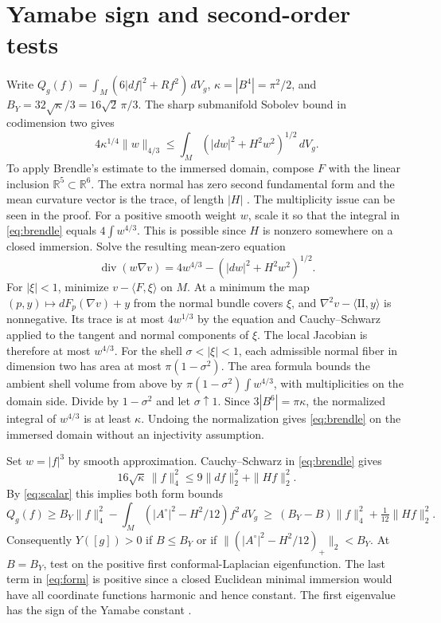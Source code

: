 \documentclass[11pt,letterpaper]{article}
\numberwithin{equation}{section}
\newcommand{\R}{\mathbb R}
\begin{document}
\section{Yamabe sign and second-order tests}\label{sec:sign}

Write \(Q_g(f)=\int_M(6|df|^2+Rf^2)\,dV_g\),
\(\kappa=|B^4|=\pi^2/2\), and \(B_Y=32\sqrt\kappa/3=16\sqrt2\,\pi/3\).
The sharp submanifold Sobolev bound in codimension two gives
\begin{equation}\label{eq:brendle}
 4\kappa^{1/4}\|w\|_{4/3}
 \le \int_M (|dw|^2+H^2w^2)^{1/2}\,dV_g .
\end{equation}
To apply Brendle's estimate to the immersed domain, compose
\(F\) with the linear inclusion \(\R^5\subset\R^6\). The extra
normal has zero second fundamental form and the mean curvature
vector is the trace, of length \(|H|\)
\cite[Corollary 2 and \S2, Lemmas 4--6]{Brendle2021Isoperimetric}.
The multiplicity issue can be seen in the proof. For a positive
smooth weight \(w\), scale it so that the integral in
\eqref{eq:brendle} equals \(4\int w^{4/3}\).
This is possible since \(H\) is nonzero somewhere on a closed
immersion. Solve the resulting mean-zero equation
\[
 \operatorname{div}(w\nabla v)=4w^{4/3}-(|dw|^2+H^2w^2)^{1/2}.
\]
For \(|\xi|<1\), minimize \(v-\langle F,\xi\rangle\) on \(M\).
At a minimum the map \((p,y)\mapsto dF_p(\nabla v)+y\)
from the normal bundle covers \(\xi\), and
\(\nabla^2v-\langle\mathrm{II},y\rangle\) is nonnegative.
Its trace is at most \(4w^{1/3}\) by the equation and
Cauchy--Schwarz applied to the tangent and normal components
of \(\xi\). The local Jacobian is therefore at most \(w^{4/3}\).
For the shell \(\sigma<|\xi|<1\), each admissible normal
fiber in dimension two has area at most \(\pi(1-\sigma^2)\).
The area formula bounds the ambient shell volume from above
by \(\pi(1-\sigma^2)\int w^{4/3}\), with multiplicities on
the domain side. Divide by \(1-\sigma^2\) and let \(\sigma\uparrow1\).
Since \(3|B^6|=\pi\kappa\), the normalized integral
of \(w^{4/3}\) is at least \(\kappa\). Undoing the normalization
gives \eqref{eq:brendle}
on the immersed domain without an injectivity assumption.

Set \(w=|f|^3\) by smooth approximation. Cauchy--Schwarz in
\eqref{eq:brendle} gives
\[
 16\sqrt\kappa\,\|f\|_4^2\le9\|df\|_2^2+\|Hf\|_2^2.
\]
By \eqref{eq:scalar} this implies both form bounds
\begin{equation}\label{eq:form}
 Q_g(f)\ge B_Y\|f\|_4^2-\int_M(|A^\circ|^2-H^2/12)f^2\,dV_g
 \ \ge\ (B_Y-B)\|f\|_4^2+\tfrac1{12}\|Hf\|_2^2 .
\end{equation}
Consequently \(Y([g])>0\) if \(B\le B_Y\) or if
\(\|(|A^\circ|^2-H^2/12)_+\|_2<B_Y\). At \(B=B_Y\), test
on the positive first conformal-Laplacian eigenfunction.
The last term in \eqref{eq:form} is positive since a
closed Euclidean minimal immersion would have all
coordinate functions harmonic and hence constant. The
first eigenvalue has the sign of the Yamabe constant
\cite[\S\S2,11]{LeeParker1987Yamabe}.
\end{document}
